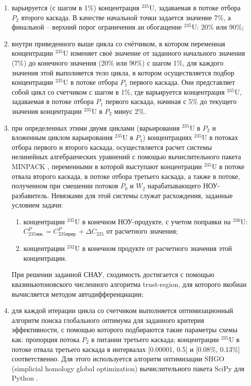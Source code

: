 \begin{enumerate}
    \item варьируется (с шагом в 1\%) концентрация $^{235}$U, задаваемая в потоке отбора $P_2$ второго каскада. В качестве начальной точки задается значение 7\%, а финальной -- верхний порог ограничения ан обогащение $^{235}$U: 20\% или 90\%;
    \item внутри приведенного выше цикла со счётчиком, в котором переменная концентрации $^{235}$U изменяет своё значение от заданного начального значения (7\%) до конечного значения (20\% или 90\%) с шагом 1\%, для каждого значения этой выполняется тело цикла, в котором осуществляется подбор концентрации $^{235}$U в потоке отбора $P_1$ первого каскада. Они представляет собой цикл со счетчиком с шагом в 1\%, где варьируется концентрация $^{235}$U, задаваемая в потоке отбора $P_1$ первого каскада, начиная с 5\% до текущего значения концентрации $^{235}$U в $P_2$ минус 2\%.
    \item при определенных этими двумя циклами (варьирования $^{235}$U в $P_2$ и вложенным циклом варьирования $^{235}$U в $P_1$) концентрациях $^{235}$U в потоках отбора первого и второго каскада, осуществляется расчет системы нелинейных алгебраических уравнений с помощью вычислительного пакета MINPACK \cite{moreMINPACK}, переменными в которой выступают концентрации $^{235}$U в потоке отвала второго каскада, в потоке отбора третьего каскада, а также в потоке, полученном при смешении потоков $P_0$ и $W_2$  нарабатывающего НОУ-разбавитель. Невязками для этой системы служат расхождения, заданные условием задачи:
    \begin{enumerate}
        \item концентрации $^{235}$U в  конечном НОУ-продукте, с учетом поправки на $^{236}$U: $C_{235 экв.}^{P}=C_{235 прир.}^{P}+\Delta C_{235}$ от расчетного значения;
        \item концентрации $^{232}$U в конечном продукте от расчетного значения этой концентрации.
    \end{enumerate}
    При решении заданной СНАУ, сходимость достигается с помощью квазиньютоновского численного алгоритма trust-region, для которого якобиан вычисляется методом автодифференциации;
    \item для каждой итерации цикла со счетчиком выполняется оптимизационный алгоритм поиска глобального оптимума для заданного критерия эффективности, с помощью которого подбираются такие параметры схемы как: пропорция потока $P_2$ в питании третьего каскада; концентрации $^{235}$U в потоке отвала третьего каскада в интервалах [0.00001, 0.5] и [0.08\%, 0.13\%] соответственно. Для этого используется алгоритм оптимизации SHGO (simplicial homology global optimization) вычислительного пакета SciPy для Python  \cite{virtanenSciPyFundamentalAlgorithms2020a}.

\end{enumerate}
